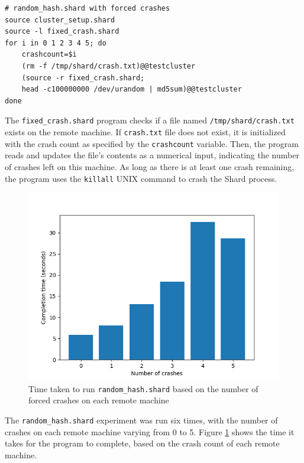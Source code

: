 \documentclass[twoside]{report}
\begin{document}
\begin{minipage}[c]{\textwidth-15pt}
  \begin{lstlisting}[language=Shard]
# random_hash.shard with forced crashes
source cluster_setup.shard
source -l fixed_crash.shard
for i in 0 1 2 3 4 5; do
    crashcount=$i
    (rm -f /tmp/shard/crash.txt)@@testcluster
    (source -r fixed_crash.shard;
    head -c100000000 /dev/urandom | md5sum)@@testcluster
done
\end{lstlisting}
  \smallskip
\end{minipage}

The \texttt{fixed\_crash.shard} program checks if a file named \texttt{/tmp/shard/crash.txt} exists on the remote machine.
If \texttt{crash.txt} file does not exist, it is initialized with the crash count as specified by the \texttt{crashcount} variable.
Then, the program reads and updates the file's contents as a numerical input, indicating the number of crashes left on this machine.
As long as there is at least one crash remaining, the program uses the \texttt{killall} UNIX command to crash the Shard process.

\begin{figure}[h]
  \begin{center}
    \includegraphics[scale=0.9]{img/experiments/e5_1620960581241.png}
    \caption{Time taken to run \texttt{random\_hash.shard} based on the number of forced crashes on each remote machine}
    \label{fig:crashhash}
  \end{center}
\end{figure}

The \texttt{random\_hash.shard} experiment was run six times, with the number of crashes on each remote machine varying from 0 to 5.
Figure \ref{fig:crashhash} shows the time it takes for the program to complete, based on the crash count of each remote machine.
\end{document}
